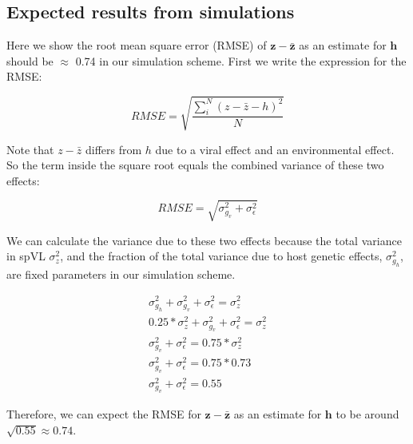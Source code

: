 \documentclass[11pt]{article}
\begin{document}
\begin{doublespace}

\subsection*{Expected results from simulations}

Here we show the root mean square error (RMSE) of $\bm{z} - \bm{\bar{z}}$ as an estimate for $\bm{h}$ should be $\approx$ 0.74 in our simulation scheme. First we write the expression for the RMSE:

\begin{equation}
    RMSE = \sqrt{\frac{\sum_i^N(z - \bar{z} - h)^2}{N}}
\end{equation}

Note that $z - \bar{z}$ differs from $h$ due to a viral effect and an environmental effect. So the term inside the square root equals the combined variance of these two effects:

\begin{equation}
    RMSE = \sqrt{\sigma^2_{g_v} + \sigma^2_\epsilon}
\end{equation}

We can calculate the variance due to these two effects because the total variance in spVL $\sigma^2_z$, and the fraction of the total variance due to host genetic effects, $\sigma^2_{g_h}$, are fixed parameters in our simulation scheme.

\begin{equation}
\begin{split}
    \sigma^2_{g_h} + \sigma^2_{g_v} + \sigma^2_\epsilon = \sigma^2_z \\
    0.25 * \sigma^2_{z} + \sigma^2_{g_v} + \sigma^2_\epsilon = \sigma^2_z \\
    \sigma^2_{g_v} + \sigma^2_\epsilon = 0.75 * \sigma^2_z \\
    \sigma^2_{g_v} + \sigma^2_\epsilon = 0.75 * 0.73 \\
    \sigma^2_{g_v} + \sigma^2_\epsilon = 0.55
\end{split}
\end{equation}

Therefore, we can expect the RMSE for $\bm{z} - \bm{\bar{z}}$ as an estimate for $\bm{h}$ to be around $\sqrt{0.55} \approx 0.74$. 

\newpage

\begin{figure}[H]
	\begin{tikzpicture}
	

\end{tikzpicture}
\end{figure}
\end{doublespace}
\end{document}
